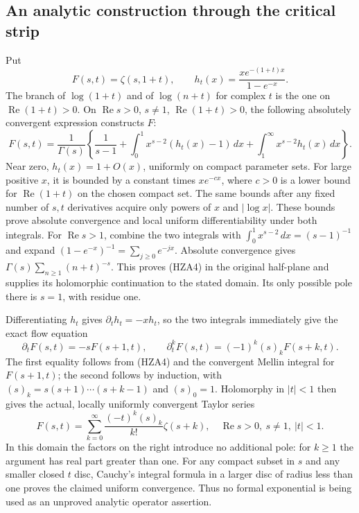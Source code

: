 \documentclass[11pt]{article}
\theoremstyle{definition}
\begin{document}
\subsection{An analytic construction through the critical strip}

Put
\begin{equation}\tag{HZA3}
 F(s,t)=\zeta(s,1+t),\qquad
 h_t(x)=\frac{x e^{-(1+t)x}}{1-e^{-x}}.
\end{equation}
The branch of $\log(1+t)$ and of $\log(n+t)$ for complex $t$ is the
one on $\operatorname{Re}(1+t)>0$. On
$\operatorname{Re}s>0$, $s\ne1$, $\operatorname{Re}(1+t)>0$, the
following absolutely convergent expression constructs $F$:
\begin{equation}\tag{HZA4}
 F(s,t)=\frac1{\Gamma(s)}\left\{
 \frac1{s-1}+
 \int_0^1 x^{s-2}(h_t(x)-1)\,dx+
 \int_1^\infty x^{s-2}h_t(x)\,dx\right\}.
\end{equation}
Near zero, $h_t(x)=1+O(x)$, uniformly on compact parameter sets.
For large positive $x$, it is bounded by a constant times
$x e^{-c x}$, where $c>0$ is a lower bound for
$\operatorname{Re}(1+t)$ on the chosen compact set. The same bounds
after any fixed number of $s,t$ derivatives acquire only powers of
$x$ and $|\log x|$. These bounds prove absolute convergence and local
uniform differentiability under both integrals. For
$\operatorname{Re}s>1$, combine the two integrals with
$\int_0^1x^{s-2}\,dx=(s-1)^{-1}$ and expand
$(1-e^{-x})^{-1}=\sum_{j\ge0}e^{-jx}$. Absolute convergence gives
$\Gamma(s)\sum_{n\ge1}(n+t)^{-s}$. This proves (HZA4) in the original
half-plane and supplies its holomorphic continuation to the stated
domain. Its only possible pole there is $s=1$, with residue one.

Differentiating $h_t$ gives $\partial_t h_t=-x h_t$, so the two
integrals immediately give the exact flow equation
\begin{equation}\tag{HZA5}
 \partial_t F(s,t)=-s F(s+1,t),\qquad
 \partial_t^kF(s,t)=(-1)^k(s)_kF(s+k,t).
\end{equation}
The first equality follows from (HZA4) and the convergent Mellin
integral for $F(s+1,t)$; the second follows by induction, with
$(s)_k=s(s+1)\cdots(s+k-1)$ and $(s)_0=1$. Holomorphy in $|t|<1$
then gives the actual, locally uniformly convergent Taylor series
\begin{equation}\tag{HZA6}
 F(s,t)=\sum_{k=0}^{\infty}
       \frac{(-t)^k(s)_k}{k!}\zeta(s+k),\quad
       \operatorname{Re}s>0,\ s\ne1,\ |t|<1.
\end{equation}
In this domain the factors on the right introduce no additional pole:
for $k\ge1$ the argument has real part greater than one.
For any compact subset in $s$ and any smaller closed $t$ disc,
Cauchy's integral formula in a larger disc of radius less than one
proves the claimed uniform convergence. Thus no formal exponential
is being used as an unproved analytic operator assertion.
\end{document}
